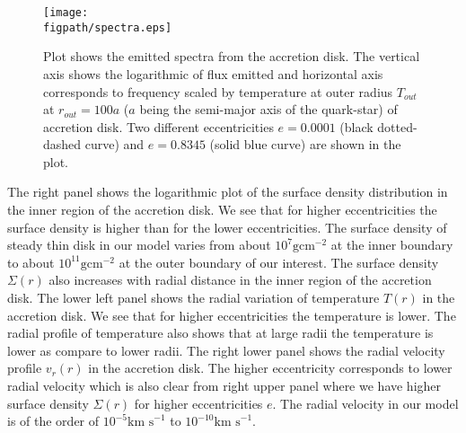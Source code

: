 \documentclass[useAMS,usenatbib]{mn2e}
\newcommand{\figpath}{./Figs/}
\begin{document}
\begin{figure}
\centering
\texttt{[image: \\figpath/spectra.eps]}
\caption{\small{Plot shows the emitted spectra from the accretion disk. The vertical axis shows the logarithmic of flux emitted and horizontal axis corresponds to frequency scaled by temperature at outer radius $T_{out}$  at $r_{out} = 100a$ ($a$ being the semi-major axis of the quark-star) of accretion disk. Two different eccentricities $e = 0.0001$ (black dotted-dashed curve) and $e = 0.8345$ (solid blue curve) are shown in the plot.}}
\label{spectra}
\end{figure}
The right panel shows the logarithmic plot of the surface density distribution in the inner region of the accretion disk. We see that for higher eccentricities the surface density is higher than for the lower eccentricities. The surface density of steady thin disk in our model varies from about $10^7 \textrm{g}\textrm{cm}^{-2}$ at the inner boundary to about $10^{11}\textrm{g}\textrm{cm}^{-2}$ at the outer boundary of our interest. The surface density $\Sigma (r)$ also increases with radial distance in the inner region of the accretion disk. The lower left panel shows the radial variation of temperature $T(r)$ in the accretion disk. We see that for higher eccentricities the temperature is lower. The radial profile of temperature also shows that at large radii the temperature is lower as compare to lower radii. The right lower panel shows the radial velocity profile $v_r(r)$ in the accretion disk. The higher eccentricity corresponds to lower radial velocity which is also clear from right upper panel where we have higher surface density $\Sigma(r)$ for higher eccentricities $e$. The radial velocity in our model is of the order of $10^{-5}\textrm{km s}^{-1}$ to $10^{-10}\textrm{km s}^{-1}$.
\end{document}
